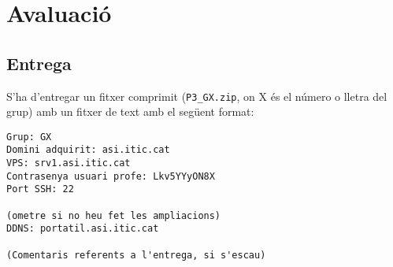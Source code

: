 \documentclass{practicaitic}
\begin{document}



\section{Avaluació}
\subsection{Entrega}
\label{sec:entrega}

S'ha d'entregar un fitxer comprimit (\texttt{P3\_GX.zip}, on X és el número o 
lletra del grup) amb un fitxer de text amb el següent format:

\begin{verbatim}
Grup: GX
Domini adquirit: asi.itic.cat
VPS: srv1.asi.itic.cat
Contrasenya usuari profe: Lkv5YYyON8X
Port SSH: 22

(ometre si no heu fet les ampliacions)
DDNS: portatil.asi.itic.cat

(Comentaris referents a l'entrega, si s'escau)
\end{verbatim}
\end{document}
